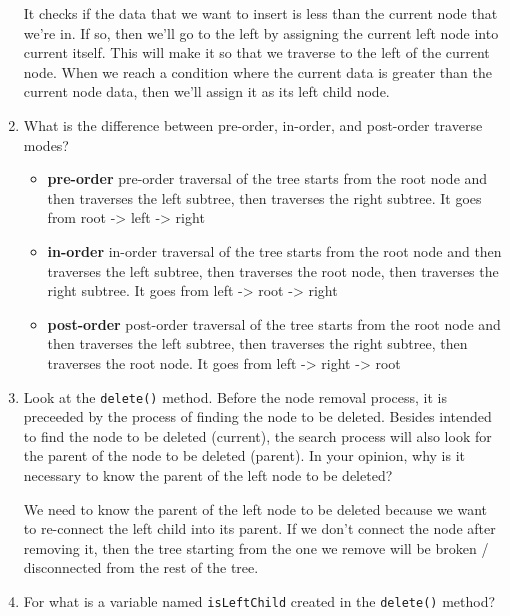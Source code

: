 \documentclass[12pt,titlepage]{article}
\begin{document}
\begin{enumerate}
{        It checks if the data that we want to insert is less than the current node that we're in. If so, then we'll go to the left by assigning the current left node into current itself.
        This will make it so that we traverse to the left of the current node. When we reach a condition where the current data is greater than the current node data, then we'll assign it
        as its left child node.
    }
    \pagebreak
    \item {
        What is the difference between pre-order, in-order, and post-order traverse modes?

        \begin{itemize}
            \item {
                \textbf{pre-order}
                pre-order traversal of the tree starts from the root node and then traverses the left subtree, then traverses the right subtree.
                It goes from root -> left -> right
            }
            \item {
                \textbf{in-order}
                in-order traversal of the tree starts from the root node and then traverses the left subtree, then traverses the root node, then traverses the right subtree.
                It goes from left -> root -> right
            }
            \item {
                \textbf{post-order}
                post-order traversal of the tree starts from the root node and then traverses the left subtree, then traverses the right subtree, then traverses the root node.
                It goes from left -> right -> root
            }
        \end{itemize}
    }
    \item {
        Look at the \texttt{delete()} method. Before the node removal process, it is preceeded by the process of finding the node to be deleted.
        Besides intended to find the node to be deleted (current), the search process will also look for the parent of the node to be deleted (parent).
        In your opinion, why is it necessary to know the parent of the left node to be deleted?

        We need to know the parent of the left node to be deleted because we want to re-connect the left child into its parent.
        If we don't connect the node after removing it, then the tree starting from the one we remove will be broken / disconnected from the rest of the tree.
    }
    \item {
        For what is a variable named \texttt{isLeftChild} created in the \texttt{delete()} method?

}
\end{enumerate}
\end{document}
